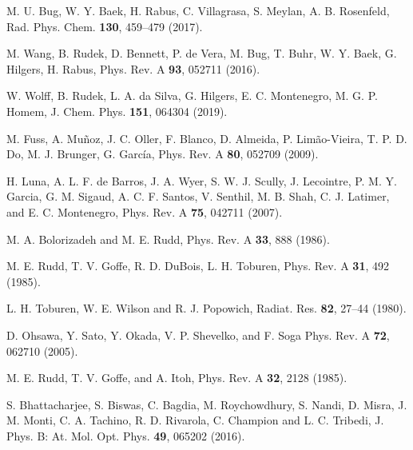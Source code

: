 \begin{thebibliography}{9}
M. U. Bug, W. Y. Baek, H. Rabus, C. Villagrasa, S. Meylan, 
A. B. Rosenfeld,
Rad. Phys. Chem. \textbf{130}, 459--479 (2017).

M. Wang, B. Rudek, D. Bennett, P. de Vera, M. Bug, T. Buhr, W. Y. Baek, 
G. Hilgers, H. Rabus, 
Phys. Rev. A \textbf{93}, 052711 (2016).

W. Wolff, B. Rudek, L. A. da Silva, G. Hilgers, E. C. Montenegro, 
M. G. P. Homem,
J. Chem. Phys. \textbf{151}, 064304 (2019).

M. Fuss, A. Muñoz, J. C. Oller, F. Blanco, D. Almeida, P. Limão-Vieira, 
T. P. D. Do, M. J. Brunger, G. Garc\'{i}a,
Phys. Rev. A \textbf{80}, 052709 (2009).

H. Luna, A. L. F. de Barros, J. A. Wyer, S. W. J. Scully, J. Lecointre, 
P. M. Y. Garcia, G. M. Sigaud, A. C. F. Santos, V. Senthil, M. B. Shah, 
C. J. Latimer, and E. C. Montenegro,
Phys. Rev. A \textbf{75}, 042711 (2007).

M. A. Bolorizadeh and M. E. Rudd, 
Phys. Rev. A \textbf{33}, 888 (1986). 

M. E. Rudd, T. V. Goffe, R. D. DuBois, L. H. Toburen, 
Phys. Rev. A \textbf{31}, 492 (1985). 

L. H. Toburen, W. E. Wilson and R. J. Popowich,
Radiat. Res. \textbf{82}, 27--44 (1980).

D. Ohsawa, Y. Sato, Y. Okada, V. P. Shevelko, and F. Soga
Phys. Rev. A \textbf{72}, 062710 (2005).

M. E. Rudd, T. V. Goffe, and A. Itoh, 
Phys. Rev. A \textbf{32}, 2128 (1985).

S. Bhattacharjee, S. Biswas, C. Bagdia, M. Roychowdhury, S. Nandi, 
D. Misra, J. M. Monti, C. A. Tachino, R. D. Rivarola, C. Champion and 
L. C. Tribedi, J. 
Phys. B: At. Mol. Opt. Phys. \textbf{49},  065202 (2016).


\end{thebibliography}

